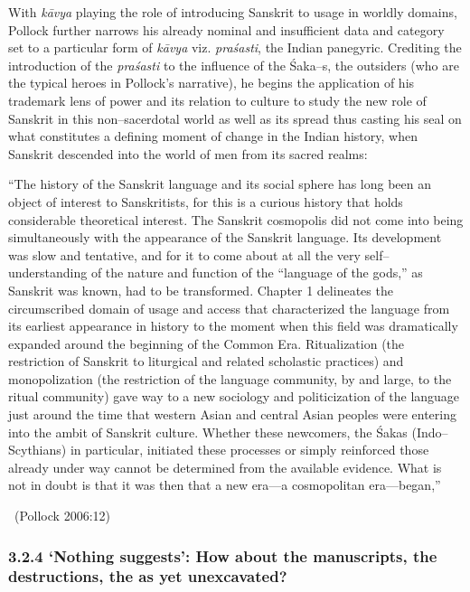 With \textit{kāvya} playing the role of introducing Sanskrit to usage in worldly domains, Pollock further narrows his already nominal and insufficient data and category set to a particular form of \textit{kāvya} viz. \textit{praśasti}, the Indian panegyric. Crediting the introduction of the \textit{praśasti} to the influence of the Śaka–s, the outsiders (who are the typical heroes in Pollock’s narrative), he begins the application of his trademark lens of power and its relation to culture to study the new role of Sanskrit in this non–sacerdotal world as well as its spread thus casting his seal on what constitutes a defining moment of change in the Indian history, when Sanskrit descended into the world of men from its sacred realms:

\begin{myquote}
“The history of the Sanskrit language and its social sphere has long been an object of interest to Sanskritists, for this is a curious history that holds considerable theoretical interest. The Sanskrit cosmopolis did not come into being simultaneously with the appearance of the Sanskrit language. Its development was slow and tentative, and for it to come about at all the very self–understanding of the nature and function of the “language of the gods,” as Sanskrit was known, had to be transformed. Chapter 1 delineates the circumscribed domain of usage and access that characterized the language from its earliest appearance in history to the moment when this field was dramatically expanded around the beginning of the Common Era. Ritualization (the restriction of Sanskrit to liturgical and related scholastic practices) and monopolization (the restriction of the language community, by and large, to the ritual community) gave way to a new sociology and politicization of the language just around the time that western Asian and central Asian peoples were entering into the ambit of Sanskrit culture. Whether these newcomers, the Śakas (Indo–Scythians) in particular, initiated these processes or simply reinforced those already under way cannot be determined from the available evidence. What is not in doubt is that it was then that a new era—a cosmopolitan era—began,” 

~\hfill (Pollock 2006:12)
\end{myquote}


\subsubsection*{3.2.4 ‘Nothing suggests’: How about the manuscripts, the destructions, the as yet unexcavated?}

